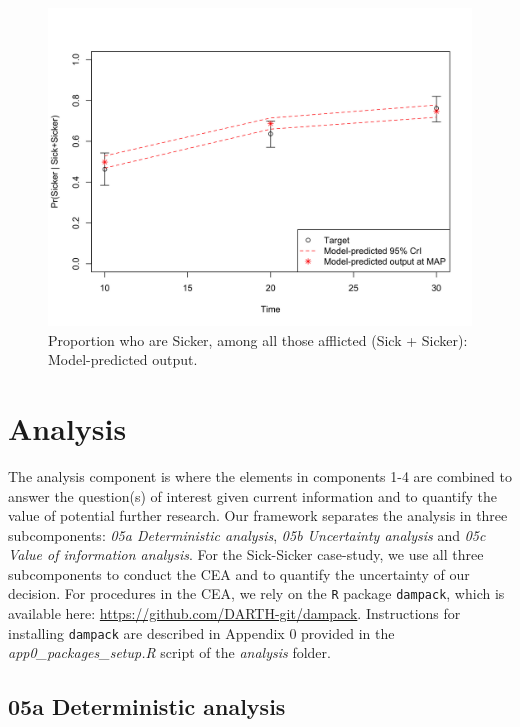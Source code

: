 \documentclass[]{book}
\begin{document}
\begin{figure}

{\centering \includegraphics[width=1\linewidth]{../figs/04_posterior_vs_targets_proportion_sicker} 

}

\caption{Proportion who are Sicker, among all those afflicted (Sick + Sicker): Model-predicted output.}\label{fig:04-proportion}
\end{figure}

\chapter{Analysis}\label{analysis}

The analysis component is where the elements in components 1-4 are
combined to answer the question(s) of interest given current information
and to quantify the value of potential further research. Our framework
separates the analysis in three subcomponents: \emph{05a Deterministic
analysis}, \emph{05b Uncertainty analysis} and \emph{05c Value of
information analysis}. For the Sick-Sicker case-study, we use all three
subcomponents to conduct the CEA and to quantify the uncertainty of our
decision. For procedures in the CEA, we rely on the \texttt{R} package
\texttt{dampack}, which is available here:
\url{https://github.com/DARTH-git/dampack}. Instructions for installing
\texttt{dampack} are described in Appendix 0 provided in the
\emph{app0\_packages\_setup.R} script of the \emph{analysis} folder.

\section{05a Deterministic analysis}\label{Deterministic-analysis}
\end{document}
